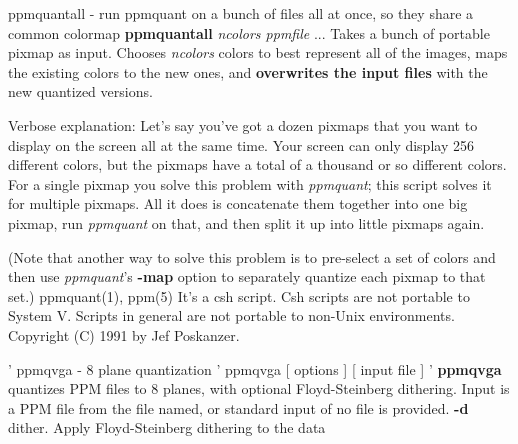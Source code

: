 ppmquantall - run ppmquant on a bunch of files all at once, so they share a common colormap
{\bf ppmquantall}
{\it ncolors ppmfile}
{\rm ...}
Takes a bunch of portable pixmap as input.
Chooses
{\it ncolors}
colors to best represent all of the images, maps the
existing colors to the new ones, and
{\bf overwrites the input files}
with the new quantized versions.
\par
Verbose explanation: Let's say you've got a dozen pixmaps that you want
to display on the screen all at the same time.  Your screen can only
display 256 different colors, but the pixmaps have a total of a thousand
or so different colors.  For a single pixmap you solve this problem with
{\it ppmquant}{\rm ;}
this script solves it for multiple pixmaps.  All it does is
concatenate them together into one big pixmap, run
{\it ppmquant}
on that, and then split it up into little pixmaps again.
\par
(Note that another way to solve this problem is to pre-select a set of
colors and then use
{\it ppmquant}{\rm 's}
{\bf -map}
option to separately quantize each pixmap to that set.)
ppmquant(1), ppm(5)
It's a csh script.
Csh scripts are not portable to System V.
Scripts in general are not portable to non-Unix environments.
Copyright (C) 1991 by Jef Poskanzer.
%

%

\newpage
%

'%
ppmqvga - 8 plane quantization
'%
ppmqvga [ options ] [ input file ]
'%
{\bf ppmqvga}
quantizes PPM files to 8 planes, with optional Floyd-Steinberg dithering.
Input is a PPM file from the file named, or standard input of no file is
provided.
{\bf -d}
dither. Apply Floyd-Steinberg dithering to the data

